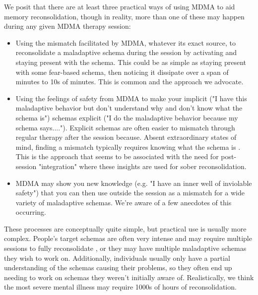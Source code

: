 \documentclass[12pt,letterpaper]{book}
\begin{document}
We posit that there are at least three practical ways of using MDMA to aid memory reconsolidation, though in reality, more than one of these may happen during any given MDMA therapy session:
\begin{itemize}
	\item Using the mismatch facilitated by MDMA, whatever its exact source, to reconsolidate a maladaptive schema during the session by activating and staying present with the schema. This could be as simple as staying present with some fear-based schema, then noticing it dissipate over a span of minutes to 10s of minutes. This is common and the approach we advocate.
	\item Using the feelings of safety from MDMA to make your implicit ("I have this maladaptive behavior but don't understand why and don't know what the schema is") schemas explicit ("I do the maladaptive behavior because my schema says...."). Explicit schemas are often easier to mismatch through regular therapy after the session because. Absent extraordinary states of mind, finding a mismatch typically requires knowing what the schema is \cite{eckerUnlocking}. This is the approach that seems to be associated with the need for post-session "integration" where these insights are used for sober reconsolidation.
	\item MDMA may show you new knowledge (e.g. "I have an inner well of inviolable safety") that you can then use outside the session as a mismatch for a wide variety of maladaptive schemas. We're aware of a few anecdotes of this occurring.
\end{itemize}
These processes are conceptually quite simple, but practical use is usually more complex. People's target schemas are often very intense and may require multiple sessions to fully reconsolidate \cite{mitchellMDMAClinicalTrial}, or they may have multiple maladaptive schemas they wish to work on. Additionally, individuals usually only have a partial understanding of the schemas causing their problems, so they often end up needing to work on schemas they weren't initially aware of. Realistically, we think the most severe mental illness may require 1000s of hours of reconsolidation.
\end{document}
